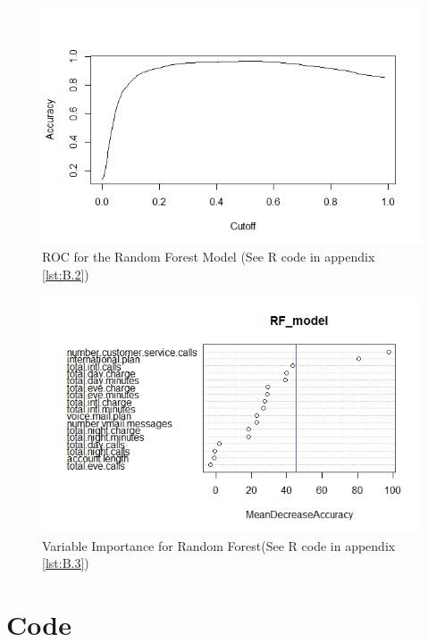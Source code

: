 \documentclass[a4paper,12pt]{report}
\begin{document}
\begin{figure}[!htbp]
\vspace{70pt}
\centering
\includegraphics[scale = 0.6]{RoC_RandomForest.jpeg}
\caption{ROC for the Random Forest Model (See R code in appendix \ref{lst:B.2})}
\label{fig:A.3}
\end{figure}
\FloatBarrier

\begin{figure}[!htbp]
\vspace{-100pt}
\centering
\includegraphics[width = \textwidth]{var_imp.jpeg}
\caption{Variable Importance for Random Forest(See R code in appendix \ref{lst:B.3})}
\label{fig:A.4}
\end{figure}
\FloatBarrier

\chapter{Code}
\end{document}
